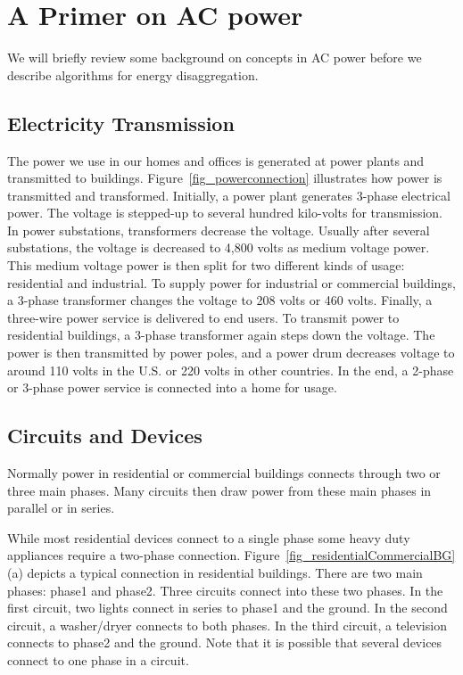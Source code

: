 \section{A Primer on AC power}
\label{sec:basic}
We will briefly review some background on concepts in AC power
before we describe algorithms for energy disaggregation.

\subsection{Electricity Transmission}
The power we use in our homes and offices is
generated at power plants and transmitted to buildings.
Figure~\ref{fig_powerconnection} illustrates how power
is transmitted and transformed.
Initially, a power plant generates 3-phase electrical power.
The voltage is stepped-up to several hundred kilo-volts for 
transmission.
In power substations, transformers decrease the
voltage. Usually after several substations,
the voltage is decreased to 4,800 volts as medium voltage power.
This medium voltage power is then split for two
different kinds of usage: residential and industrial.
To supply power for industrial or commercial buildings,
a 3-phase transformer changes the voltage to 208 volts or 460 volts.
Finally, a three-wire power service is delivered to end users.
To transmit power to residential buildings,
a 3-phase transformer again steps down the voltage.
The power is then transmitted by power poles, and
a power drum decreases voltage to around 110 volts
in the U.S. or 220 volts in other countries.
In the end, a 2-phase or 3-phase power service
is connected into a home for usage.


\subsection{Circuits and Devices}
Normally power in residential or commercial buildings
connects through two or three main phases.
Many circuits then draw power from these main phases
in parallel or in series.

While most residential devices connect to a single phase some
heavy duty appliances require a two-phase connection.
Figure~\ref{fig_residentialCommercialBG} (a) depicts a typical connection
in residential buildings. 
There are two main phases: phase1 and phase2.
Three circuits connect into these two phases.
In the first circuit, two lights connect in series to phase1 and the ground.
In the second circuit, a washer/dryer connects to both phases.
In the third circuit, a television connects to phase2 and the ground.
Note that it is possible that several devices
connect to one phase in a circuit.

